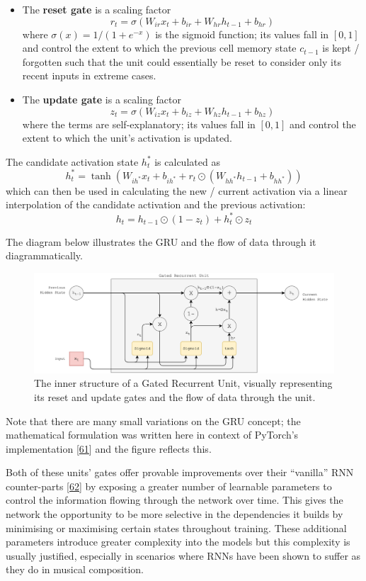 \documentclass[12pt,]{article}
\providecommand{\tightlist}{%
  \setlength{\itemsep}{0pt}\setlength{\parskip}{0pt}}
\begin{document}
\begin{itemize}
\tightlist
\item
  The \textbf{reset gate} is a scaling factor
  \[r_t = \sigma(W_{ir} x_t + b_{ir} + W_{hr} h_{t-1} + b_{hr})\] where
  \(\sigma(x) = 1 / (1 + e^{-x})\) is the sigmoid function; its values
  fall in \([0,1]\) and control the extent to which the previous cell
  memory state \(c_{t-1}\) is kept / forgotten such that the unit could
  essentially be reset to consider only its recent inputs in extreme
  cases.
\item
  The \textbf{update gate} is a scaling factor
  \[z_t = \sigma(W_{iz} x_t + b_{iz} + W_{hz} h_{t-1} + b_{hz})\] where
  the terms are self-explanatory; its values fall in \([0,1]\) and
  control the extent to which the unit's activation is updated.
\end{itemize}

The candidate activation state \(h_t^*\) is calculated as
\[h_t^* = \tanh(W_{ih^*} x_t + b_{ih^*} + r_t \odot (W_{hh^*} h_{t-1} + b_{hh^*}))\]
which can then be used in calculating the new / current activation via a
linear interpolation of the candidate activation and the previous
activation: \[h_t = h_{t-1} \odot (1 - z_t) + h_t^* \odot z_t\]

The diagram below illustrates the GRU and the flow of data through it
diagrammatically.

\begin{figure}
\centering
\includegraphics{Images/gru.png}
\caption{The inner structure of a Gated Recurrent Unit, visually
representing its reset and update gates and the flow of data through the
unit.}
\end{figure}

Note that there are many small variations on the GRU concept; the
mathematical formulation was written here in context of PyTorch's
implementation {[}\protect\hyperlink{ref-pytorchgru}{61}{]} and the
figure reflects this.

Both of these units' gates offer provable improvements over their
``vanilla'' RNN counter-parts
{[}\protect\hyperlink{ref-chung2014empirical}{62}{]} by exposing a
greater number of learnable parameters to control the information
flowing through the network over time. This gives the network the
opportunity to be more selective in the dependencies it builds by
minimising or maximising certain states throughout training. These
additional parameters introduce greater complexity into the models but
this complexity is usually justified, especially in scenarios where RNNs
have been shown to suffer as they do in musical composition.
\end{document}

